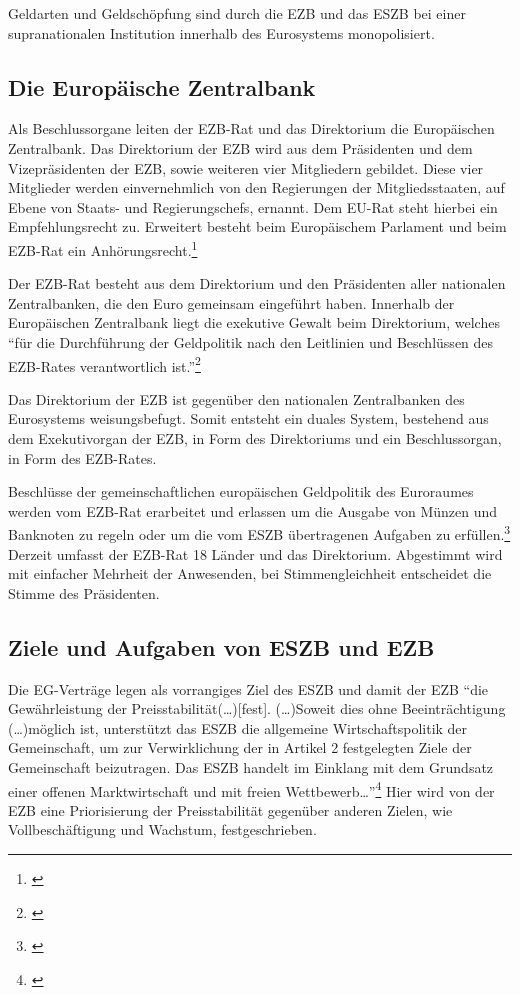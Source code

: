 \documentclass[
        onecolumn,
        a4paper,
        abstracton,
        parskip=half
        ,final
        ]{scrartcl}
\begin{document}
Geldarten und Geldsch{\"o}pfung sind durch die EZB und das ESZB bei einer supranationalen Institution innerhalb des Eurosystems monopolisiert.

\subsection{Die Europ{\"a}ische Zentralbank}
Als Beschlussorgane leiten der EZB-Rat und das Direktorium die Europ{\"a}ischen Zentralbank. Das Direktorium der \ac{EZB} wird aus dem Pr{\"a}sidenten und dem Vizepr{\"a}sidenten der EZB, sowie weiteren vier Mitgliedern gebildet. Diese vier Mitglieder werden einvernehmlich von den Regierungen der Mitgliedsstaaten, auf Ebene von Staats- und Regierungschefs, ernannt. Dem EU-Rat steht hierbei ein Empfehlungsrecht zu. Erweitert besteht beim Europ{\"a}ischem Parlament und beim EZB-Rat ein Anh{\"o}rungsrecht.\footnote[33]{\citep*[vgl.][S.553]{Basseler2010}}

Der EZB-Rat besteht aus dem Direktorium und den Pr{\"a}sidenten aller nationalen Zentralbanken, die den Euro gemeinsam eingef{\"u}hrt haben. Innerhalb der Europ{\"a}ischen Zentralbank liegt die exekutive Gewalt beim Direktorium, welches "`f{\"u}r die Durchf{\"u}hrung der Geldpolitik nach den Leitlinien und Beschl{\"u}ssen des EZB-Rates verantwortlich ist."'\footnote[34]{\citep*[S.553]{Basseler2010}}

Das Direktorium der \ac{EZB} ist gegen{\"u}ber den nationalen Zentralbanken des Eurosystems weisungsbefugt. Somit entsteht ein duales System, bestehend aus dem Exekutivorgan der EZB, in Form des Direktoriums und ein Beschlussorgan, in Form des EZB-Rates.

Beschl{\"u}sse der gemeinschaftlichen europ{\"a}ischen Geldpolitik des Euroraumes werden vom EZB-Rat erarbeitet und erlassen um die Ausgabe von M{\"u}nzen und Banknoten zu regeln oder um die vom \ac{ESZB} {\"u}bertragenen Aufgaben zu erf{\"u}llen.\footnote[35]{\citep*[vgl.][S.553]{Basseler2010}}
Derzeit umfasst der EZB-Rat 18 L{\"a}nder und das Direktorium. Abgestimmt wird mit einfacher Mehrheit der Anwesenden, bei Stimmengleichheit entscheidet die Stimme des Pr{\"a}sidenten.


\subsection{Ziele und Aufgaben von ESZB und EZB}  %
Die EG-Vertr{\"a}ge legen als vorrangiges Ziel des \ac{ESZB} und damit der EZB "`die Gew{\"a}hrleistung der Preisstabilit{\"a}t(\ldots)[fest]. (\ldots)Soweit dies ohne Beeintr{\"a}chtigung (\ldots)m{\"o}glich ist, unterst{\"u}tzt das ESZB die allgemeine Wirtschaftspolitik der Gemeinschaft, um zur Verwirklichung der in Artikel 2 festgelegten Ziele der Gemeinschaft beizutragen. Das ESZB handelt im Einklang mit dem Grundsatz einer offenen Marktwirtschaft und mit freien Wettbewerb\ldots"'\footnote[36]{\citep*[vgl.][S.554]{Basseler2010}} Hier wird von der EZB eine Priorisierung der Preisstabilit{\"a}t gegen{\"u}ber anderen Zielen, wie Vollbesch{\"a}ftigung und Wachstum, festgeschrieben.
\end{document}

